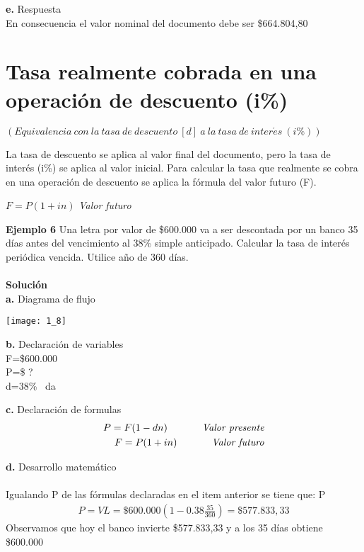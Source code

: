\textbf{e.} Respuesta
\\
En consecuencia el valor nominal del documento debe ser 
\$664.804,80


\section{Tasa realmente cobrada en una operación de descuento (i\%)}$(Equivalencia\  con\ la\  tasa\  de\  descuento\  [d]\  a\  la\  tasa\  de\  inter\acute{e}s\  (i\%))$


La tasa de descuento se aplica al valor final del documento, pero la tasa de interés (i\%) se aplica al valor inicial. Para calcular la tasa que realmente se cobra en una operación de descuento se aplica la fórmula del valor futuro (F).

\begin{center}
$F=P(1+in)$ \hspace{35 pt} \textit{Valor futuro}
\end{center}

\textbf{Ejemplo 6}
Una letra por valor de \$600.000 va a ser descontada por un banco 35 días antes del vencimiento al 38\%  simple anticipado. Calcular la tasa de interés periódica vencida. Utilice año de 360 días.
\\\\
\textbf{Solución}\\
\textbf{a.} Diagrama de flujo
\begin{center}
\texttt{[image: 1\_8]}
\end{center}
\textbf{b.} Declaración de variables \\
F=\$600.000\\
P=\$ ?\\
d=38\% \ da

\textbf{c.} Declaración de formulas\\
\begin{align*}
P=F(1-dn) \hspace{35 pt} \textit{Valor presente} \\
F=P(1+in)\hspace{35 pt} \textit{Valor futuro}\\
\end{align*}

\textbf{d.} Desarrollo matemático\\
\\
Igualando P de las fórmulas declaradas en el item anterior se tiene que:
P 
\begin{align*}
P=VL=\$600.000(1-0.38  \frac{35}{360})=\$577.833,33
\end{align*}
Observamos que hoy el banco invierte \$577.833,33 y a los  35 días obtiene \$600.000

